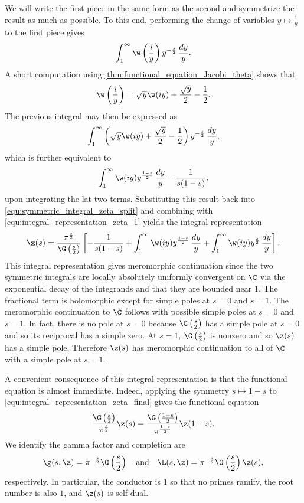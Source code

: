 \documentclass[12pt]{article}
\begin{document}
      We will write the first piece in the same form as the second and symmetrize the result as much as possible. To this end, performing the change of variables \(y \mapsto \frac{1}{y}\) to the first piece gives
      \[
        \int_{1}^{\infty}\w\left(\frac{i}{y}\right)y^{-\frac{s}{2}}\,\frac{dy}{y}.
      \]
      A short computation using \cref{thm:functional_equation_Jacobi_theta} shows that
      \[
        \w\left(\frac{i}{y}\right) = \sqrt{y}\w(iy)+\frac{\sqrt{y}}{2}-\frac{1}{2}.
      \]
      The previous integral may then be expressed as
      \[
        \int_{1}^{\infty}\left(\sqrt{y}\w(iy)+\frac{\sqrt{y}}{2}-\frac{1}{2}\right)y^{-\frac{s}{2}}\,\frac{dy}{y},
      \]
      which is further equivalent to
      \[
        \int_{1}^{\infty}\w(iy)y^{\frac{1-s}{2}}\,\frac{dy}{y}-\frac{1}{s(1-s)},
      \]
      upon integrating the lat two terms. Substituting this result back into \cref{equ:symmetric_integral_zeta_split} and combining with \cref{equ:integral_representation_zeta_1} yields the integral representation
      \begin{equation}\label{equ:integral_representation_zeta_final}
        \z(s) = \frac{\pi^{\frac{s}{2}}}{\G\left(\frac{s}{2}\right)}\left[-\frac{1}{s(1-s)}+\int_{1}^{\infty}\w(iy)y^{\frac{1-s}{2}}\,\frac{dy}{y}+\int_{1}^{\infty}\w(iy)y^{\frac{s}{2}}\,\frac{dy}{y}\right].
      \end{equation}
      This integral representation gives meromorphic continuation since the two symmetric integrals are locally absolutely uniformly convergent on \(\C\) via the exponential decay of the integrands and that they are bounded near \(1\). The fractional term is holomorphic except for simple poles at \(s = 0\) and \(s = 1\). The meromorphic continuation to \(\C\) follows with possible simple poles at \(s = 0\) and \(s = 1\). In fact, there is no pole at \(s = 0\) because \(\G\left(\frac{s}{2}\right)\) has a simple pole at \(s = 0\) and so its reciprocal has a simple zero. At \(s = 1\), \(\G\left(\frac{s}{2}\right)\) is nonzero and so \(\z(s)\) has a simple pole. Therefore \(\z(s)\) has meromorphic continuation to all of \(\C\) with a simple pole at \(s = 1\).

      A convenient consequence of this integral representation is that the functional equation is almost immediate. Indeed, applying the symmetry \(s \mapsto 1-s\) to \cref{equ:integral_representation_zeta_final} gives the functional equation
      \[
        \frac{\G\left(\frac{s}{2}\right)}{\pi^{\frac{s}{2}}}\z(s) = \frac{\G\left(\frac{1-s}{2}\right)}{\pi^{\frac{1-s}{2}}}\z(1-s).
      \]
      We identify the gamma factor and completion are 
      \[
        \g(s,\z) = \pi^{-\frac{s}{2}}\G\left(\frac{s}{2}\right) \quad \text{and} \quad \L(s,\z) = \pi^{-\frac{s}{2}}\G\left(\frac{s}{2}\right)\z(s),
      \]
      respectively. In particular, the conductor is \(1\) so that no primes ramify, the root number is also \(1\), and \(\z(s)\) is self-dual.
      
\end{document}
